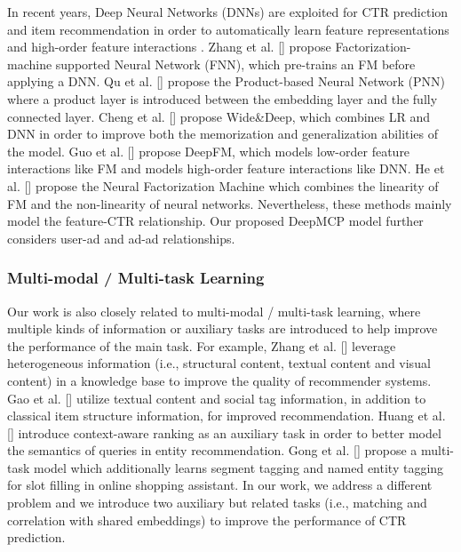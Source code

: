\documentclass{article}
\begin{document}
In recent years, Deep Neural Networks (DNNs) are exploited for CTR prediction and item recommendation in order to automatically learn feature representations and high-order feature interactions \cite{van2013deep,covington2016deep,wang2017deep,he2017neural}.
Zhang et al. [\citeyear{zhang2016deep}] propose Factorization-machine supported Neural Network (FNN), which pre-trains an FM before applying a DNN. Qu et al. [\citeyear{qu2016product}] propose the Product-based Neural Network (PNN) where a product layer is introduced between the embedding layer and the fully connected layer. Cheng et al. [\citeyear{cheng2016wide}] propose Wide\&Deep, which combines LR and DNN in order to improve both the memorization and generalization abilities of the model.
Guo et al. [\citeyear{guo2017deepfm}] propose DeepFM, which models low-order feature interactions like FM and models high-order feature interactions like DNN.
He et al. [\citeyear{he2017neural}] propose the Neural Factorization Machine which combines the linearity of FM and the non-linearity of neural networks.
Nevertheless, these methods mainly model the feature-CTR relationship. Our proposed DeepMCP model further considers user-ad and ad-ad relationships.

\subsubsection{Multi-modal / Multi-task Learning}
Our work is also closely related to multi-modal / multi-task learning, where multiple kinds of information or auxiliary tasks are introduced to help improve the performance of the main task. For example, Zhang et al. [\citeyear{zhang2016collaborative}] leverage heterogeneous information (i.e., structural content, textual content and visual content) in a knowledge base to improve the quality of recommender systems. Gao et al. [\citeyear{gao2018recommendation}] utilize textual content and social tag information, in addition to classical item structure information, for improved recommendation.
Huang et al. [\citeyear{huang2018improving}] introduce context-aware ranking as an auxiliary task in order to better model the semantics of queries in entity recommendation.
Gong et al. [\citeyear{gong2019deep}] propose a multi-task model which additionally learns segment tagging and named entity tagging for slot filling in online shopping assistant. In our work, we address a different problem and we introduce two auxiliary but related tasks (i.e., matching and correlation with shared embeddings) to improve the performance of CTR prediction.
\end{document}
